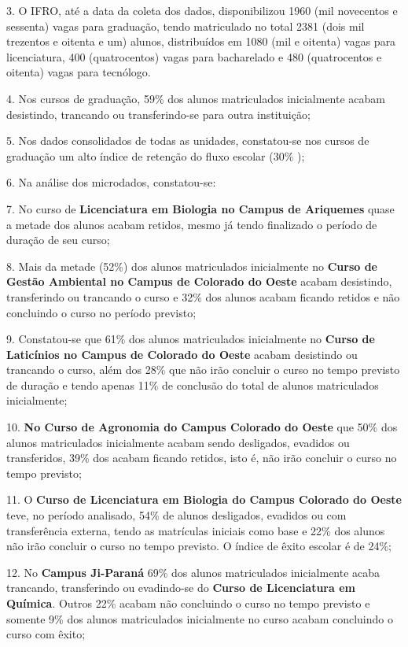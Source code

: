 \documentclass[article,12pt,onesidea,4paper,english,brazil]{abntex2}
\begin{document}
	3. O IFRO, até a data da coleta dos dados, disponibilizou 1960 (mil novecentos e sessenta)
	vagas para graduação, tendo matriculado no total 2381 (dois mil trezentos e oitenta e um)
	alunos, distribuídos em 1080 (mil e oitenta) vagas para licenciatura, 400 (quatrocentos)
	vagas para bacharelado e 480 (quatrocentos e oitenta) vagas para tecnólogo.
	
	4. Nos cursos de graduação, 59\% dos alunos matriculados inicialmente acabam desistindo,
	trancando ou transferindo-se para outra instituição;
	
	5. Nos dados consolidados de todas as unidades, constatou-se nos cursos de graduação um
	alto índice de retenção do fluxo escolar (30\% );

	6. Na análise dos microdados, constatou-se:
	
	7. No curso de \textbf{Licenciatura em Biologia no Campus de Ariquemes} quase a metade dos
	alunos acabam retidos, mesmo já tendo finalizado o período de duração de seu curso;
	
	8. Mais da metade (52\%) dos alunos matriculados inicialmente no \textbf{Curso de Gestão
	Ambiental no Campus de Colorado do Oeste} acabam desistindo, transferindo ou
	trancando o curso e 32\% dos alunos acabam ficando retidos e não concluindo o curso no
	período previsto;
	
	9. Constatou-se que 61\% dos alunos matriculados inicialmente no \textbf{Curso de Laticínios no
	Campus de Colorado do Oeste} acabam desistindo ou trancando o curso, além dos 28\%
	que não irão concluir o curso no tempo previsto de duração e tendo apenas 11\% de
	conclusão do total de alunos matriculados inicialmente;
	
	10. \textbf{No Curso de Agronomia do Campus Colorado do Oeste} que 50\% dos alunos
	matriculados inicialmente acabam sendo desligados, evadidos ou transferidos, 39\% dos
	acabam ficando retidos, isto é, não irão concluir o curso no tempo previsto;
	
	11. O \textbf{Curso de Licenciatura em Biologia do Campus Colorado do Oeste} teve, no período
	analisado, 54\% de alunos desligados, evadidos ou com transferência externa, tendo as
	matrículas iniciais como base e 22\% dos alunos não irão concluir o curso no tempo
	previsto. O índice de êxito escolar é de 24\%;
	
	12. No \textbf{Campus Ji-Paraná} 69\% dos alunos matriculados inicialmente acaba trancando,
	transferindo ou evadindo-se do \textbf{Curso de Licenciatura em Química}. Outros 22\% acabam
	não concluindo o curso no tempo previsto e somente 9\% dos alunos matriculados
	inicialmente no curso acabam concluindo o curso com êxito;
	
\end{document}
